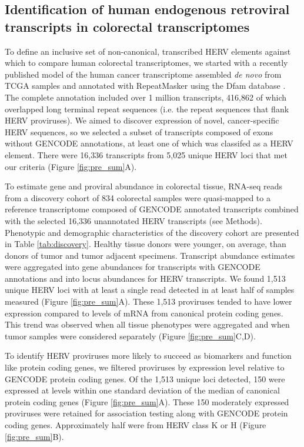 \subsection*{Identification of human endogenous retroviral transcripts in colorectal transcriptomes}
To define an inclusive set of non-canonical, transcribed HERV elements against which to compare human colorectal transcriptomes, we started with a recently published model of the human cancer transcriptome assembled \emph{de novo} from TCGA samples and annotated with RepeatMasker using the Dfam database \citep{Attig2019}.
The complete annotation included over 1 million transcripts, 416,862 of which overlapped long terminal repeat sequences (i.e. the repeat sequences that flank HERV proviruses).
We aimed to discover expression of novel, cancer-specific HERV sequences, so we selected a subset of transcripts composed of exons without GENCODE annotations, at least one of which was classifed as a HERV element.
There were 16,336 transcripts from 5,025 unique HERV loci that met our criteria (Figure \ref{fig:pre_sum}A).

To estimate gene and proviral abundance in colorectal tissue, RNA-seq reads from a discovery cohort of 834 colorectal samples were quasi-mapped to a reference transcriptome composed of GENCODE annotated transcripts combined with the selected 16,336 unannotated HERV transcripts (see Methods).
Phenotypic and demographic characteristics of the discovery cohort are presented in Table \ref{tab:discovery}.
Healthy tissue donors were younger, on average, than donors of tumor and tumor adjacent specimens.
Transcript abundance estimates were aggregated into gene abundances for transcripts with GENCODE annotations and into locus abundances for HERV transcripts.
We found 1,513 unique HERV loci with at least a single read detected in at least half of samples measured (Figure \ref{fig:pre_sum}A).
These 1,513 proviruses tended to have lower expression compared to levels of mRNA from canonical protein coding genes.
This trend was observed when all tissue phenotypes were aggregated and when tumor samples were considered separately (Figure \ref{fig:pre_sum}C,D).

To identify HERV proviruses more likely to succeed as biomarkers and function like protein coding genes, we filtered proviruses by expression level relative to GENCODE protein coding genes.
Of the 1,513 unique loci detected, 150 were expressed at levels within one standard deviation of the median of canonical protein coding genes (Figure \ref{fig:pre_sum}A).
These 150 moderately expressed proviruses were retained for association testing along with GENCODE protein coding genes.
Approximately half were from HERV class K or H (Figure \ref{fig:pre_sum}B).

